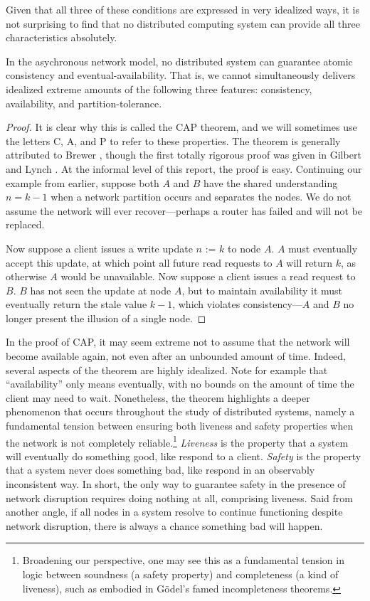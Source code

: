 Given that all three of these conditions are expressed in very
idealized ways, it is not surprising to find that no distributed
computing system can provide all three characteristics absolutely.

\begin{theorem}
  In the asychronous network model, no distributed system can
  guarantee atomic consistency and eventual-availability. That is, we
  cannot simultaneously delivers idealized extreme amounts of the
  following three features: consistency, availability, and
  partition-tolerance.
\end{theorem}
\begin{proof}
  It is clear why this is called the CAP theorem, and we will
  sometimes use the letters C, A, and P to refer to these
  properties. The theorem is generally attributed to Brewer
  \cite{2000brewerCAP}, though the first totally rigorous proof was
  given in Gilbert and Lynch \cite{2002gilbertlynchCAP}. At the
  informal level of this report, the proof is easy. Continuing our
  example from earlier, suppose both $A$ and $B$ have the shared
  understanding $n = k - 1$ when a network partition occurs and
  separates the nodes. We do not assume the network will ever
  recover---perhaps a router has failed and will not be replaced.

  Now suppose a client issues a write update $n \textrm{ := } k$ to
  node $A$.  $A$ must eventually accept this update, at which point
  all future read requests to $A$ will return $k$, as otherwise $A$
  would be unavailable. Now suppose a client issues a read request to
  $B$. $B$ has not seen the update at node $A$, but to maintain
  availability it must eventually return the stale value $k-1$, which
  violates consistency---$A$ and $B$ no longer present the illusion of
  a single node.
\end{proof}

In the proof of CAP, it may seem extreme not to assume that the
network will become available again, not even after an unbounded
amount of time. Indeed, several aspects of the theorem are highly
idealized. Note for example that ``availability'' only means
eventually, with no bounds on the amount of time the client may need
to wait. Nonetheless, the theorem highlights a deeper phenomenon that
occurs throughout the study of distributed systems, namely a
fundamental tension between ensuring both liveness and safety
properties when the network is not completely
reliable.\footnote{Broadening our perspective, one may see this as a
fundamental tension in logic between soundness (a safety property) and
completeness (a kind of liveness), such as embodied in G\"odel's famed
incompleteness theorems.}  \cite{2012perspectivesCAP} \emph{Liveness}
is the property that a system will eventually do something good, like
respond to a client. \emph{Safety} is the property that a system never
does something bad, like respond in an observably inconsistent way. In
short, the only way to guarantee safety in the presence of network
disruption requires doing nothing at all, comprising liveness. Said
from another angle, if all nodes in a system resolve to continue
functioning despite network disruption, there is always a chance
something bad will happen.

